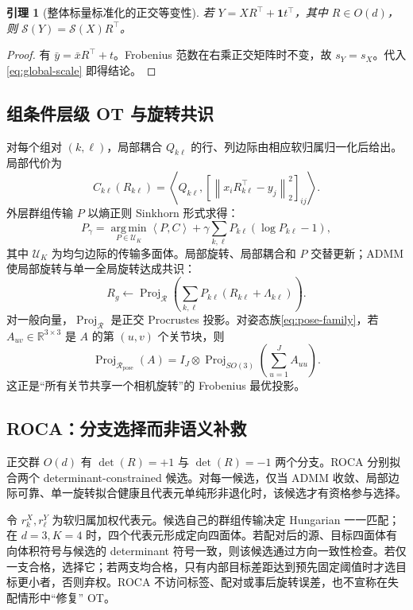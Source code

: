 \documentclass[UTF8,a4paper,11pt]{ctexart}
\newcommand{\RR}{\mathbb{R}}
\newcommand{\norm}[1]{\left\lVert #1\right\rVert}
\newcommand{\inner}[2]{\left\langle #1,#2\right\rangle}
\newcommand{\Proj}{\operatorname{Proj}}
\newcommand{\argmin}{\operatorname*{arg\,min}}
\newtheorem{lemma}[theorem]{引理}
\theoremstyle{definition}
\theoremstyle{remark}
\begin{document}
\begin{lemma}[整体标量标准化的正交等变性]\label{lem:equivariance}
若 $Y=XR^\top+\bm1t^\top$，其中 $R\in O(d)$，则 $\mathcal S(Y)=\mathcal S(X)R^\top$。
\end{lemma}
\begin{proof}
有 $\bar y=\bar xR^\top+t$。Frobenius 范数在右乘正交矩阵时不变，故 $s_Y=s_X$。代入\cref{eq:global-scale} 即得结论。
\end{proof}

\subsection{组条件层级 OT 与旋转共识}
对每个组对 $(k,\ell)$，局部耦合 $Q_{k\ell}$ 的行、列边际由相应软归属归一化后给出。局部代价为
\begin{equation}
 C_{k\ell}(R_{k\ell})=
 \inner{Q_{k\ell}}{\left[\norm{x_iR_{k\ell}^\top-y_j}_2^2\right]_{ij}}.
\end{equation}
外层群组传输 $P$ 以熵正则 Sinkhorn 形式求得：
\begin{equation}\label{eq:group-ot}
 P_\gamma=\argmin_{P\in\mathcal U_K}
 \inner{P}{C}+\gamma\sum_{k,\ell}P_{k\ell}(\log P_{k\ell}-1),
\end{equation}
其中 $\mathcal U_K$ 为均匀边际的传输多面体。局部旋转、局部耦合和 $P$ 交替更新；ADMM 使局部旋转与单一全局旋转达成共识：
\begin{equation}\label{eq:consensus}
 R_g\leftarrow\Proj_{\mathcal R}\left(\sum_{k,\ell}P_{k\ell}(R_{k\ell}+\Lambda_{k\ell})\right).
\end{equation}
对一般向量，$\Proj_{\mathcal R}$ 是正交 Procrustes 投影\cite{umeyama1991least,cuturi2013sinkhorn}。对姿态族\cref{eq:pose-family}，若 $A_{uv}\in\RR^{3\times3}$ 是 $A$ 的第 $(u,v)$ 个关节块，则
\begin{equation}
 \Proj_{\mathcal R_{\mathrm{pose}}}(A)=I_J\otimes
 \Proj_{SO(3)}\left(\sum_{u=1}^J A_{uu}\right).
\end{equation}
这正是“所有关节共享一个相机旋转”的 Frobenius 最优投影。

\subsection{ROCA：分支选择而非语义补救}
正交群 $O(d)$ 有 $\det(R)=+1$ 与 $\det(R)=-1$ 两个分支。ROCA 分别拟合两个 determinant-constrained 候选。对每一候选，仅当 ADMM 收敛、局部边际可靠、单一旋转拟合健康且代表元单纯形非退化时，该候选才有资格参与选择。

令 $r_k^X,r_\ell^Y$ 为软归属加权代表元。候选自己的群组传输决定 Hungarian 一一匹配；在 $d=3,K=4$ 时，四个代表元形成定向四面体。若配对后的源、目标四面体有向体积符号与候选的 determinant 符号一致，则该候选通过方向一致性检查。若仅一支合格，选择它；若两支均合格，只有内部目标差距达到预先固定阈值时才选目标更小者，否则弃权。ROCA 不访问标签、配对或事后旋转误差，也不宣称在失配情形中“修复” OT。
\end{document}
